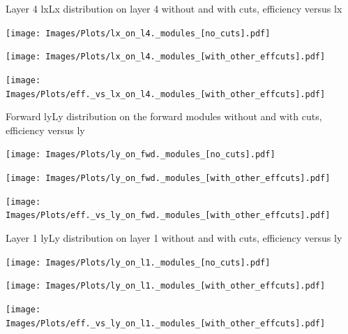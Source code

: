\documentclass{beamer}
\begin{document}
\begin{frame}{Layer 4 lx}{Lx distribution on layer 4 without and with cuts, efficiency versus lx}
\begin{minipage}{0.32\textwidth}
  \centering
  \texttt{[image: Images/Plots/lx\_on\_l4.\_modules\_[no\_cuts].pdf]}
\end{minipage}%
\hspace{0.01\textwidth}%
\begin{minipage}{0.32\textwidth}
  \centering
  \texttt{[image: Images/Plots/lx\_on\_l4.\_modules\_[with\_other\_effcuts].pdf]}
\end{minipage}%
\hspace{0.01\textwidth}%
\begin{minipage}{0.32\textwidth}
  \centering
  \texttt{[image: Images/Plots/eff.\_vs\_lx\_on\_l4.\_modules\_[with\_other\_effcuts].pdf]}
\end{minipage}
\end{frame}

\begin{frame}{Forward ly}{Ly distribution on the forward modules without and with cuts, efficiency versus ly}
\begin{minipage}{0.32\textwidth}
  \centering
  \texttt{[image: Images/Plots/ly\_on\_fwd.\_modules\_[no\_cuts].pdf]}
\end{minipage}%
\hspace{0.01\textwidth}%
\begin{minipage}{0.32\textwidth}
  \centering
  \texttt{[image: Images/Plots/ly\_on\_fwd.\_modules\_[with\_other\_effcuts].pdf]}
\end{minipage}%
\hspace{0.01\textwidth}%
\begin{minipage}{0.32\textwidth}
  \centering
  \texttt{[image: Images/Plots/eff.\_vs\_ly\_on\_fwd.\_modules\_[with\_other\_effcuts].pdf]}
\end{minipage}
\end{frame}

\begin{frame}{Layer 1 ly}{Ly distribution on layer 1 without and with cuts, efficiency versus ly}
\begin{minipage}{0.32\textwidth}
  \centering
  \texttt{[image: Images/Plots/ly\_on\_l1.\_modules\_[no\_cuts].pdf]}
\end{minipage}%
\hspace{0.01\textwidth}%
\begin{minipage}{0.32\textwidth}
  \centering
  \texttt{[image: Images/Plots/ly\_on\_l1.\_modules\_[with\_other\_effcuts].pdf]}
\end{minipage}%
\hspace{0.01\textwidth}%
\begin{minipage}{0.32\textwidth}
  \centering
  \texttt{[image: Images/Plots/eff.\_vs\_ly\_on\_l1.\_modules\_[with\_other\_effcuts].pdf]}
\end{minipage}
\end{frame}
\end{document}
